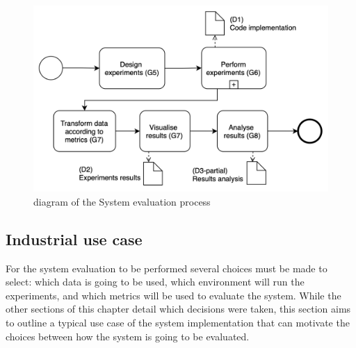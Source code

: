 \begin{figure}[!ht]
    \begin{center}
      \includegraphics[width=\textwidth]{figures/3-method/research_process_rq2.png}
    \caption{ diagram of the System evaluation process}
    \label{fig:DevProcessRQ2}
    \end{center}
\end{figure}

\subsection{Industrial use case}
\label{subsec:use_case}

For the system evaluation to be performed several choices must be made to select: which data is going to be used, which environment will run the experiments, and which metrics will be used to evaluate the system. While the other sections of this chapter detail which decisions were taken, this section aims to outline a typical use case of the system implementation that can motivate the choices between how the system is going to be evaluated.

